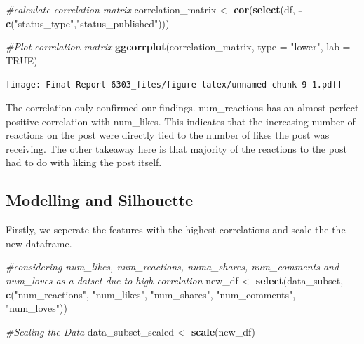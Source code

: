 \documentclass[
]{article}
\newenvironment{Shaded}{\begin{snugshade}}{\end{snugshade}}
\newcommand{\AttributeTok}[1]{\textcolor[rgb]{0.13,0.29,0.53}{#1}}
\newcommand{\CommentTok}[1]{\textcolor[rgb]{0.56,0.35,0.01}{\textit{#1}}}
\newcommand{\ConstantTok}[1]{\textcolor[rgb]{0.56,0.35,0.01}{#1}}
\newcommand{\FunctionTok}[1]{\textcolor[rgb]{0.13,0.29,0.53}{\textbf{#1}}}
\newcommand{\NormalTok}[1]{#1}
\newcommand{\OtherTok}[1]{\textcolor[rgb]{0.56,0.35,0.01}{#1}}
\newcommand{\SpecialCharTok}[1]{\textcolor[rgb]{0.81,0.36,0.00}{\textbf{#1}}}
\newcommand{\StringTok}[1]{\textcolor[rgb]{0.31,0.60,0.02}{#1}}
\begin{document}
\begin{Shaded}
\begin{Highlighting}[]
\CommentTok{\#calculate correlation matrix}
\NormalTok{correlation\_matrix }\OtherTok{\textless{}{-}} \FunctionTok{cor}\NormalTok{(}\FunctionTok{select}\NormalTok{(df, }\SpecialCharTok{{-}}\FunctionTok{c}\NormalTok{(}\StringTok{"status\_type"}\NormalTok{,}\StringTok{"status\_published"}\NormalTok{)))}

\CommentTok{\#Plot correlation matrix}
\FunctionTok{ggcorrplot}\NormalTok{(correlation\_matrix, }\AttributeTok{type =} \StringTok{"lower"}\NormalTok{, }\AttributeTok{lab =} \ConstantTok{TRUE}\NormalTok{)}
\end{Highlighting}
\end{Shaded}

\texttt{[image: Final-Report-6303\_files/figure-latex/unnamed-chunk-9-1.pdf]}

The correlation only confirmed our findings. num\_reactions has an
almost perfect positive correlation with num\_likes. This indicates that
the increasing number of reactions on the post were directly tied to the
number of likes the post was receiving. The other takeaway here is that
majority of the reactions to the post had to do with liking the post
itself.

\subsection{Modelling and Silhouette}\label{modelling-and-silhouette}

Firstly, we seperate the features with the highest correlations and
scale the the new dataframe.

\begin{Shaded}
\begin{Highlighting}[]
\CommentTok{\#considering num\_likes, num\_reactions, numa\_shares, num\_comments and num\_loves as a datset due to high correlation}
\NormalTok{new\_df }\OtherTok{\textless{}{-}} \FunctionTok{select}\NormalTok{(data\_subset, }\FunctionTok{c}\NormalTok{(}\StringTok{"num\_reactions"}\NormalTok{, }\StringTok{"num\_likes"}\NormalTok{, }\StringTok{"num\_shares"}\NormalTok{,}
                                \StringTok{"num\_comments"}\NormalTok{, }\StringTok{"num\_loves"}\NormalTok{))}
\end{Highlighting}
\end{Shaded}

\begin{Shaded}
\begin{Highlighting}[]
\CommentTok{\#Scaling the Data}
\NormalTok{data\_subset\_scaled }\OtherTok{\textless{}{-}} \FunctionTok{scale}\NormalTok{(new\_df)}
\end{Highlighting}
\end{Shaded}
\end{document}
